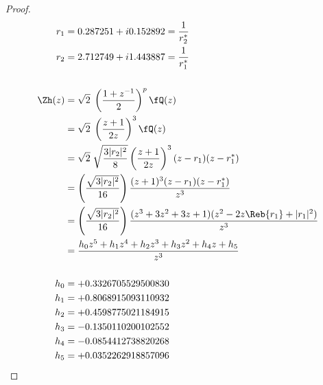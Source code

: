 \begin{proof}
\begin{align*}
  r_1 &= 0.287251+i0.152892 = \frac{1}{r_2^\ast}
\\r_2 &= 2.712749+i1.443887 = \frac{1}{r_1^\ast}
\\
\\
  \Zh(z)
    &= \sqrt{2}\; \left(\frac{1+z^{-1}}{2}\right)^p \fQ(z)
  \\&= \sqrt{2}\; \left(\frac{z+1}{2z}\right)^3     \fQ(z)
  \\&= \sqrt{2}\; \sqrt{\frac{3|r_2|^2}{8}}
       \left( \frac{z+1}{2z} \right)^3
       (z-r_1)(z-r_1^\ast)
  \\&= \left(\frac{\sqrt{3|r_2|^2}}{16}\right)
       \frac{(z+1)^3(z-r_1)(z-r_1^\ast)}{z^3}
  \\&= \left(\frac{\sqrt{3|r_2|^2}}{16}\right)
       \frac{(z^3+3z^2+3z+1)(z^2-2z\Reb{r_1} + |r_1|^2)}{z^3}
  \\&= \frac{h_0z^5 + h_1z^4 + h_2z^3 + h_3z^2 + h_4z + h_5}
            {z^3}
\\
\\
  h_0 &= +0.3326705529500830 \\
  h_1 &= +0.8068915093110932 \\
  h_2 &= +0.4598775021184915 \\
  h_3 &= -0.1350110200102552 \\
  h_4 &= -0.0854412738820268 \\
  h_5 &= +0.0352262918857096 \\
\end{align*}
\end{proof}

